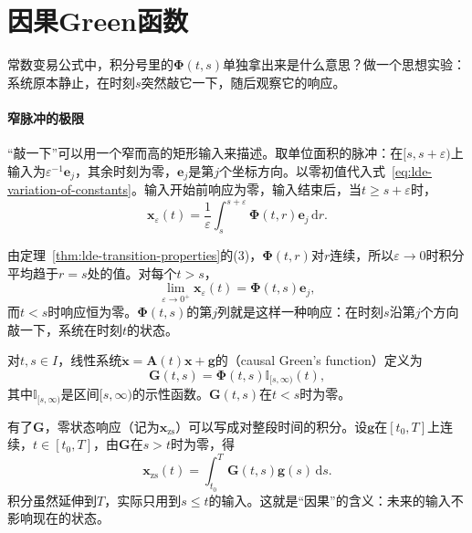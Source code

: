 \section{因果Green函数}
\label{sec:lde-green}

常数变易公式中，积分号里的$\bm{\Phi}(t,s)$单独拿出来是什么意思？做一个思想实验：系统原本静止，在时刻$s$突然敲它一下，随后观察它的响应。

\paragraph{窄脉冲的极限}
“敲一下”可以用一个窄而高的矩形输入来描述。取单位面积的脉冲：在$[s,s+\varepsilon)$上输入为$\varepsilon^{-1}\bm{e}_j$，其余时刻为零，$\bm{e}_j$是第$j$个坐标方向。以零初值代入式~\eqref{eq:lde-variation-of-constants}。输入开始前响应为零，输入结束后，当$t\geq s+\varepsilon$时，
\[
 \bm{x}_{\varepsilon}(t)=\frac{1}{\varepsilon}\int_s^{s+\varepsilon}\bm{\Phi}(t,r)\bm{e}_j\,\mathrm{d}r.
\]

由定理~\ref{thm:lde-transition-properties}的(3)，$\bm{\Phi}(t,r)$对$r$连续，所以$\varepsilon\to0$时积分平均趋于$r=s$处的值。对每个$t>s$，
\begin{equation}
 \lim_{\varepsilon\to0^+}\bm{x}_{\varepsilon}(t)=\bm{\Phi}(t,s)\bm{e}_j,
 \label{eq:lde-pulse-limit}
\end{equation}
而$t<s$时响应恒为零。$\bm{\Phi}(t,s)$的第$j$列就是这样一种响应：在时刻$s$沿第$j$个方向敲一下，系统在时刻$t$的状态。

\begin{definition}[因果Green函数]
\label{def:lde-causal-green}
对$t,s\in I$，线性系统$\dot{\bm{x}}=\bm{A}(t)\bm{x}+\bm{g}$的（causal Green's function）定义为
\begin{equation}
 \bm{G}(t,s)=\bm{\Phi}(t,s)\mathbb{I}_{[s,\infty)}(t),
 \label{eq:lde-causal-green}
\end{equation}
其中$\mathbb{I}_{[s,\infty)}$是区间$[s,\infty)$的示性函数。$\bm{G}(t,s)$在$t<s$时为零。
\end{definition}

有了$\bm{G}$，零状态响应（记为$\bm{x}_{\mathrm{zs}}$）可以写成对整段时间的积分。设$\bm{g}$在$[t_0,T]$上连续，$t\in[t_0,T]$，由$\bm{G}$在$s>t$时为零，得
\begin{equation}
 \bm{x}_{\mathrm{zs}}(t)=\int_{t_0}^{T}\bm{G}(t,s)\bm{g}(s)\,\mathrm{d}s.
 \label{eq:lde-green-solution}
\end{equation}
积分虽然延伸到$T$，实际只用到$s\leq t$的输入。这就是“因果”的含义：未来的输入不影响现在的状态。

